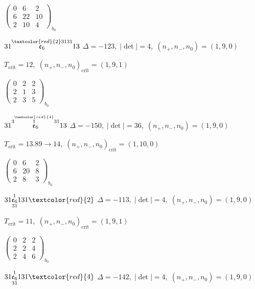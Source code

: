 \documentclass[10pt]{article}
\begin{document}
\hspace{2em}$\left(\begin{smallmatrix}0 & 6 & 2 \\ 6 & 22 & 10 \\ 2 & 10 & 4\end{smallmatrix}\right)_{\!b_0}$

$31\overset{\textcolor{red}{2}3131}{\mathfrak{e}_6}13$ \quad $\Delta=-123,\; |\det|=4,\; (n_+,n_-,n_0)=(1,9,0)$

\hspace{1em}$T_{\text{crit}}=12,\; (n_+,n_-,n_0)_{\text{crit}}=(1,9,1)$

\hspace{2em}$\left(\begin{smallmatrix}0 & 2 & 2 \\ 2 & 1 & 3 \\ 2 & 3 & 5\end{smallmatrix}\right)_{\!b_0}$

$31\overset{3\overset{\textcolor{red}{4}}{1}31}{\mathfrak{e}_6}13$ \quad $\Delta=-150,\; |\det|=36,\; (n_+,n_-,n_0)=(1,9,0)$

\hspace{1em}$T_{\text{crit}}=13.89 \to 14,\; (n_+,n_-,n_0)_{\text{crit}}=(1,10,0)$

\hspace{2em}$\left(\begin{smallmatrix}0 & 6 & 2 \\ 6 & 20 & 8 \\ 2 & 8 & 3\end{smallmatrix}\right)_{\!b_0}$

\smallskip

$31\overset{1}{\underset{31}{\mathfrak{e}_6}}131\textcolor{red}{2}$ \quad $\Delta=-113,\; |\det|=4,\; (n_+,n_-,n_0)=(1,9,0)$

\hspace{1em}$T_{\text{crit}}=11,\; (n_+,n_-,n_0)_{\text{crit}}=(1,9,1)$

\hspace{2em}$\left(\begin{smallmatrix}0 & 2 & 2 \\ 2 & 2 & 4 \\ 2 & 4 & 6\end{smallmatrix}\right)_{\!b_0}$

$31\overset{1}{\underset{31}{\mathfrak{e}_6}}131\textcolor{red}{4}$ \quad $\Delta=-142,\; |\det|=4,\; (n_+,n_-,n_0)=(1,9,0)$
\end{document}
